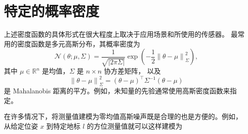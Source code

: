 \documentclass[fontset=none]{Notes}
\newcommand{\norm}[1]{\left\lVert#1\right\rVert}
\begin{document}
\section{特定的概率密度}

上述密度函数的具体形式在很大程度上取决于应用场景和所使用的传感器。
最常用的密度函数是多元高斯分布，其概率密度为
\[
  \mathcal{N}(\theta;\mu,\Sigma)=\frac{1}{\sqrt{|2\pi\Sigma|}}
  \exp\left(-\frac{1}{2}\norm{\theta-\mu}_{\Sigma}^2\right),
\]
其中 $\mu\in \mathbb{R}^n$ 是均值，$\Sigma$ 是 $n\times n$ 协方差矩阵，
以及
\[
  \norm{\theta-\mu}_{\Sigma}^2=(\theta-\mu)^\top\Sigma^{-1}(\theta-\mu)
\]
是 Mahalanobis 距离的平方。例如，未知量的先验通常使用高斯密度函数来指定。

在许多情况下，将测量值建模为零均值高斯噪声既是合理的也是方便的。例如，
从给定位姿 $x$ 到特定地标 $l$ 的方位测量值就可以这样建模为
\end{document}
